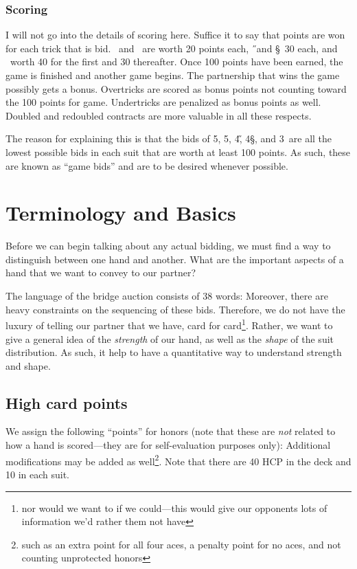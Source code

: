 \documentclass[oneside]{memoir}
\begin{document}
\subsection{Scoring}
I will not go into the details of scoring here.  Suffice it to say
that points are won for each trick that is bid.  \C\ and \D\ are worth
20 points each, \H\ and \S\ 30 each, and \NT\ worth 40 for the first and
30 thereafter.  Once 100 points have been earned, the game is finished
and another game begins.  The partnership that wins the game possibly
gets a bonus.  Overtricks are scored as bonus points not counting
toward the 100 points for game.  Undertricks are penalized as bonus
points as well.  Doubled and redoubled contracts are more valuable in
all these respects.

The reason for explaining this is that the bids of 5\C, 5\D, 4\H, 4\S,
and 3\NT\ are all the lowest possible bids in each suit that are worth at
least 100 points.  As such, these are known as ``game bids'' and are to
be desired whenever possible.

\chapter{Terminology and Basics}
Before we can begin talking about any actual bidding, we must find a way
to distinguish between one hand and another.  What are the important aspects
of a hand that we want to convey to our partner?

The language of the bridge auction consists of 38 words:
Moreover, there are heavy constraints on the sequencing of these bids.
Therefore, we do not have the luxury of telling our partner that we
have, card for card\footnote{nor would we want to if we could---this
  would give our opponents lots of information we'd rather them not
  have}.  Rather, we want to give a general idea of the
\textit{strength} of our hand, as well as the \textit{shape} of the
suit distribution.
As such, it help to have a quantitative way to understand strength and
shape.

\section{High card points}
We assign the following ``points'' for honors (note that these are \textit{not}
related to how a hand is scored---they are for self-evaluation purposes only):
Additional modifications may be added as well\footnote{such as an
  extra point for all four aces, a penalty point for no aces, and not
  counting unprotected honors}.  Note that there are 40 HCP in the
deck and 10 in each suit.  
\end{document}
